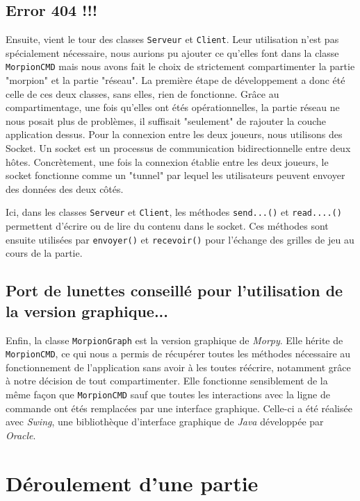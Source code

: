 \documentclass{report}
\begin{document}
\subsection*{Error 404 !!!}

Ensuite, vient le tour des classes \texttt{Serveur} et \texttt{Client}. Leur utilisation n'est pas spécialement nécessaire, nous aurions pu ajouter ce qu'elles font dans la classe \texttt{MorpionCMD} mais nous avons fait le choix de strictement compartimenter la partie "morpion" et la partie "réseau".
La première étape de développement a donc été celle de ces deux classes, sans elles, rien de fonctionne. 
Grâce au compartimentage, une fois qu'elles ont étés opérationnelles, la partie réseau ne nous posait plus de problèmes, il suffisait "seulement" de rajouter la couche application dessus. 
Pour la connexion entre les deux joueurs, nous utilisons des Socket. Un socket est un processus de communication bidirectionnelle entre deux hôtes. Concrètement, une fois la connexion établie entre les deux joueurs, le socket fonctionne comme un "tunnel" par lequel les utilisateurs peuvent envoyer des données des deux côtés.

Ici, dans les classes \texttt{Serveur} et \texttt{Client}, les méthodes \texttt{send...()} et \texttt{read....()} permettent d'écrire ou de lire du contenu dans le socket. Ces méthodes sont ensuite utilisées par \texttt{envoyer()} et \texttt{recevoir()} pour l'échange des grilles de jeu au cours de la partie.


\subsection*{Port de lunettes conseillé pour l'utilisation de la version graphique...}


Enfin, la classe \texttt{MorpionGraph} est la version graphique de \emph{Morpy}. Elle hérite de \texttt{MorpionCMD}, ce qui nous a permis de récupérer toutes les méthodes nécessaire au fonctionnement de l'application sans avoir à les toutes réécrire, notamment grâce à notre décision de tout compartimenter.
Elle fonctionne sensiblement de la même façon que \texttt{MorpionCMD} sauf que toutes les interactions avec la ligne de commande ont étés remplacées par une interface graphique. Celle-ci a été réalisée avec \emph{Swing}, une bibliothèque d'interface graphique de \emph{Java} développée par \emph{Oracle}.


\section*{Déroulement d'une partie}
\end{document}
